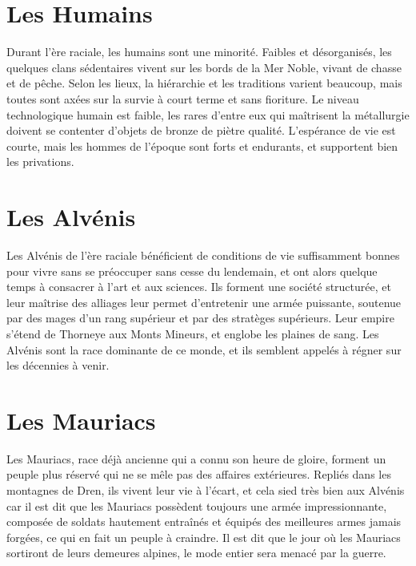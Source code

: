 \section{Les Humains}
Durant l'ère raciale, les humains sont une minorité. Faibles et désorganisés, les quelques clans sédentaires vivent sur les bords de la Mer Noble, vivant de chasse et de pêche. Selon les lieux, la hiérarchie et les traditions varient beaucoup, mais toutes sont axées sur la survie à court terme et sans fioriture. Le niveau technologique humain est faible, les rares d'entre eux qui maîtrisent la métallurgie doivent se contenter d'objets de bronze de piètre qualité. L'espérance de vie est courte, mais les hommes de l'époque sont forts et endurants, et supportent bien les privations.

\section{Les Alvénis}
Les Alvénis de l'ère raciale bénéficient de conditions de vie suffisamment bonnes pour vivre sans se préoccuper sans cesse du lendemain, et ont alors quelque temps à consacrer à l'art et aux sciences. Ils forment une société structurée, et leur maîtrise des alliages leur permet d'entretenir une armée puissante, soutenue par des mages d'un rang supérieur et par des stratèges supérieurs. Leur empire s'étend de Thorneye aux Monts Mineurs, et englobe les plaines de sang. Les Alvénis sont la race dominante de ce monde, et ils semblent appelés à régner sur les décennies à venir.

\section{Les Mauriacs}
Les Mauriacs, race déjà ancienne qui a connu son heure de gloire, forment un peuple plus réservé qui ne se mêle pas des affaires extérieures. Repliés dans les montagnes de Dren, ils vivent leur vie à l'écart, et cela sied très bien aux Alvénis car il est dit que les Mauriacs possèdent toujours une armée impressionnante, composée de soldats hautement entraînés et équipés des meilleures armes jamais forgées, ce qui en fait un peuple à craindre. Il est dit que le jour où les Mauriacs sortiront de leurs demeures alpines, le mode entier sera menacé par la guerre.

